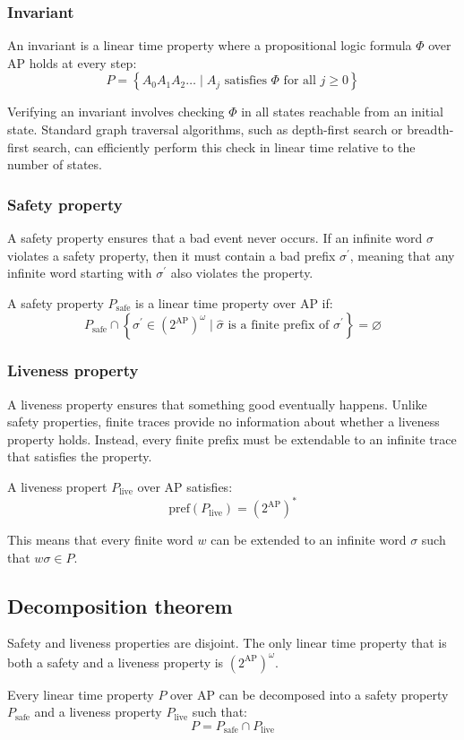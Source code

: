 \subsubsection{Invariant}
\begin{definition}
    An invariant is a linear time property where a propositional logic formula $\Phi$ over $\text{AP}$ holds at every step:
    \[P=\left\{A_0A_1A_2\dots\mid A_j\text{ satisfies }\Phi\text{ for all }j\geq 0\right\}\]
\end{definition}
\noindent Verifying an invariant involves checking $\Phi$ in all states reachable from an initial state.
Standard graph traversal algorithms, such as depth-first search or breadth-first search, can efficiently perform this check in linear time relative to the number of states.

\subsubsection{Safety property}
A safety property ensures that a bad event never occurs. 
If an infinite word $\sigma$ violates a safety property, then it must contain a bad prefix $\sigma^\prime$, meaning that any infinite word starting with $\sigma^\prime$ also violates the property.
\begin{definition}
    A safety property $P_{\text{safe}}$ is a linear time property over $\text{AP}$ if:
    \[P_{\text{safe}}\cap\left\{\sigma^\prime\in\left(2^{\text{AP}}\right)^\omega\mid\hat{\sigma}\text{ is a finite prefix of }\sigma^\prime\right\}=\varnothing\]
\end{definition}

\subsubsection{Liveness property}
A liveness property ensures that something good eventually happens. 
Unlike safety properties, finite traces provide no information about whether a liveness property holds. 
Instead, every finite prefix must be extendable to an infinite trace that satisfies the property.
\begin{definition}
    A liveness propert $P_{\text{live}}$ over $\text{AP}$ satisfies: 
    \[\text{pref}(P_{\text{live}})=\left(2^{\text{AP}}\right)^\ast\]
\end{definition}
\noindent This means that every finite word $w$ can be extended to an infinite word $\sigma$ such that $w\sigma\in P$.

\subsection{Decomposition theorem}
Safety and liveness properties are disjoint.
The only linear time property that is both a safety and a liveness property is $\left(2^{\text{AP}}\right)^\omega$. 
\begin{theorem}
    Every linear time property $P$ over $\text{AP}$ can be decomposed into a safety property $P_{\text{safe}}$ and a liveness property $P_{\text{live}}$ such that: 
    \[P=P_{\text{safe}}\cap P_{\text{live}}\]
\end{theorem}